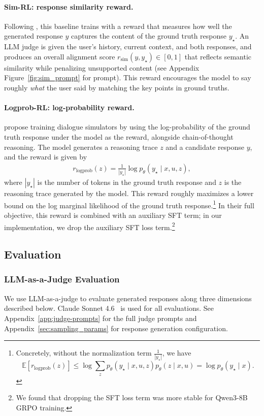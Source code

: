 \documentclass{article} %
\begin{document}
\paragraph{Sim-RL: response similarity reward.}
Following \citet{wu2026humanlm}, this baseline trains with a reward that measures how well the generated response $y$ captures the content of the ground truth response $y_\star$. An LLM judge is given the user's history, current context, and both responses, and produces an overall alignment score $r_{\mathrm{sim}}(y, y_\star) \in [0,1]$ that reflects semantic similarity while penalizing unsupported content (see Appendix Figure~\ref{fig:sim_prompt} for prompt). This reward encourages the model to say roughly \emph{what} the user said by matching the key points in ground truths.

\paragraph{Logprob-RL: log-probability reward.}
\citet{gandhi2026dialogue} propose training dialogue simulators by using the log-probability of the ground truth response under the model as the reward, alongside chain-of-thought reasoning. The model generates a reasoning trace $z$ and a candidate response $y$, and the reward is given by
\begin{align*}
r_{\mathrm{logprob}}(z) = \frac{1}{|y_\star|}\log p_\theta(y_\star \mid x, u, z),
\end{align*}
where $|y_\star|$ is the number of tokens in the ground truth response and $z$ is the reasoning trace generated by the model. This reward roughly maximizes a lower bound on the log marginal likelihood of the ground truth response.\footnote{Concretely, without the normalization term $\frac{1}{|y_\star|}$, we have $$\mathbb{E}[r_{\mathrm{logprob}}(z) ] \le \log \sum_{z} p_\theta(y_\star \mid x, u, z) p_\theta(z \mid x, u) = \log p_\theta(y_\star \mid x).$$}
In their full objective, this reward is combined with an auxiliary SFT term; in our implementation, we drop the auxiliary SFT loss term.\footnote{We found that dropping the SFT loss term was more stable for Qwen3-8B GRPO training.}

\subsection{Evaluation}
\subsubsection{LLM-as-a-Judge Evaluation}
We use LLM-as-a-judge to evaluate generated responses along three dimensions described below. Claude Sonnet 4.6~\citep{anthropic2026claudesonnet46} is used for all evaluations. See Appendix~\ref{app:judge-prompts} for the full judge prompts and Appendix~\ref{sec:sampling_params} for response generation configuration.
\end{document}
